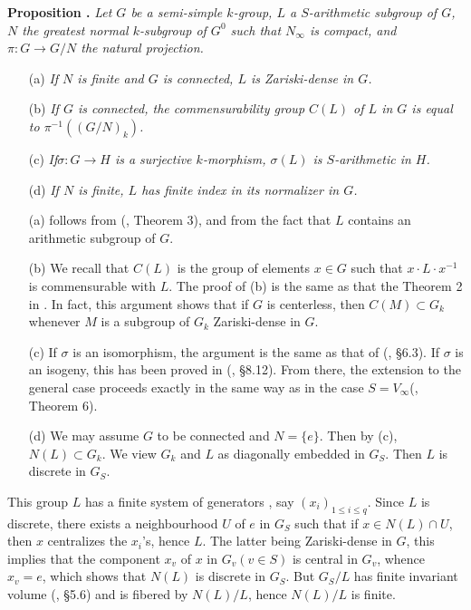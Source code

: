 \medskip
\noindent
{\bf Proposition .\label{art04-prop3.3}}
{\em Let $G$ be a semi-simple $k$-group, $L$ a $S$-arithmetic subgroup of $G$, $N$ the greatest normal $k$-subgroup of $G^{0}$ such that $N_{\infty}$ is compact, and $\pi:G\to G/N$ the natural projection.}
\begin{itemize}
\item[{\rm(a)}] {\em If $N$ is finite and $G$ is connected, $L$ is Zariski-dense in $G$.}
\item[{\rm(b)}] {\em If $G$ is connected, the commensurability group $C(L)$ of $L$ in $G$ is equal to $\pi^{-1}((G/N)_{k})$.}
\item[{\rm(c)}] {\em If\pageoriginale $\sigma:G\to H$ is a surjective $k$-morphism, $\sigma(L)$ is $S$-arithmetic in $H$.}

\item[{\rm(d)}] {\em If $N$ is finite, $L$ has finite index in its normalizer in $G$.}
\end{itemize}

\medskip

\begin{itemize}
\item[(a)] follows from (\cite{art04-key6}, Theorem 3), and from the fact that $L$ contains an arithmetic subgroup of $G$.

\item[(b)] We recall that $C(L)$ is the group of elements $x\in G$ such that $x\cdot L\cdot x^{-1}$ is commensurable with $L$. The proof of (b) is the same as that the Theorem 2 in \cite{art04-key6}. In fact, this argument shows that if $G$ is centerless, then $C(M)\subset G_{k}$ whenever $M$ is a subgroup of $G_{k}$ Zariski-dense in $G$.

\item[(c)] If $\sigma$ is an isomorphism, the argument is the same as that of (\cite{art04-key7}, \S6.3). If $\sigma$ is an isogeny, this has been proved in (\cite{art04-key5}, \S8.12). From there, the extension to the general case proceeds exactly in the same way as in the case $S=V_{\infty}$(\cite{art04-key6}, Theorem 6).

\item[(d)] We may assume $G$ to be connected and $N=\{e\}$. Then by (c), $N(L)\subset G_{k}$. We view $G_{k}$ and $L$ as diagonally embedded in $G_{S}$. Then $L$ is discrete in $G_{S}$.
\end{itemize}

This group $L$ has a finite system of generators \cite{art04-key17}, say $(x_{i})_{1\leq i\leq q}$. Since $L$ is discrete, there exists a neighbourhood $U$ of $e$ in $G_{S}$ such that if $x\in N(L)\cap U$, then $x$ centralizes the $x_{i}$'s, hence $L$. The latter being Zariski-dense in $G$, this implies that the component $x_{v}$ of $x$ in $G_{v}(v\in S)$ is central in $G_{v}$, whence $x_{v}=e$, which shows that $N(L)$ is discrete in $G_{S}$. But $G_{S}/L$ has finite invariant volume (\cite{art04-key5}, \S5.6) and is fibered by $N(L)/L$, hence $N(L)/L$ is finite.

